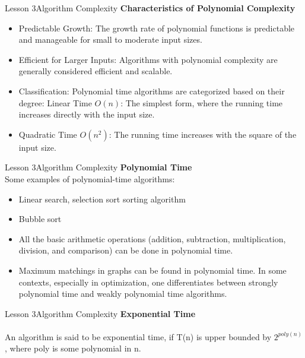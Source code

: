 \documentclass[aspectratio=1610]{beamer}
\begin{document}
\begin{frame}{Lesson 3}{Algorithm Complexity}
\LARGE
\textbf{Characteristics of Polynomial Complexity}\\
\Large
\begin{itemize}
	\item Predictable Growth: The growth rate of polynomial functions is predictable and manageable for small to moderate input sizes.
	\item Efficient for Larger Inputs: Algorithms with polynomial complexity are generally considered efficient and scalable.
	\item Classification: Polynomial time algorithms are categorized based on their degree: Linear Time $O(n)$: The simplest form, where the running time increases directly with the input size.
	\item Quadratic Time $O(n^2)$: The running time increases with the square of the input size.
\end{itemize}
\end{frame}




\begin{frame}{Lesson 3}{Algorithm Complexity}
\LARGE
\textbf{Polynomial Time}\\
\Large
Some examples of polynomial-time algorithms:
\begin{itemize}
	\item Linear search, selection sort sorting algorithm 
	\item Bubble sort
	\item All the basic arithmetic operations (addition, subtraction, multiplication, division, and comparison) can be done in polynomial time.
	\item Maximum matchings in graphs can be found in polynomial time. In some contexts, especially in optimization, one differentiates between strongly polynomial time and weakly polynomial time algorithms.
\end{itemize}
\end{frame}



\begin{frame}{Lesson 3}{Algorithm Complexity}
\LARGE
\textbf{Exponential Time}\\~\\
\Large
An algorithm is said to be exponential time, if T(n) is upper bounded by
\(2^{poly(n)}\), where poly is some polynomial in n.
\end{frame}
\end{document}
